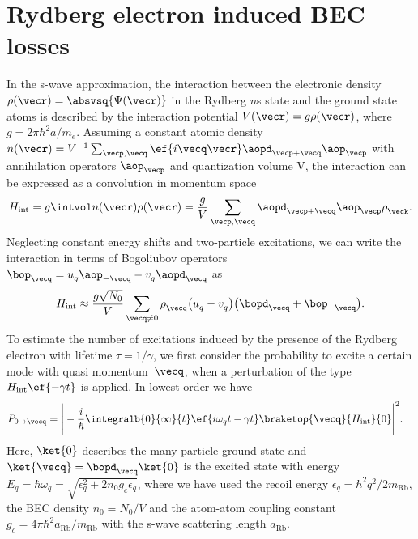 \chapter{Rydberg electron induced BEC losses}
\label{rydberg_losses}

\newcommand{\bogu}{\ensuremath{u^{\phantom\dagger}}\xspace}
\newcommand{\bogv}{\ensuremath{v^{\phantom\dagger}}\xspace}
\newcommand{\rhok}{\ensuremath{\rho^{\phantom\dagger}_{\veck}}\xspace}
\newcommand{\rhoq}{\ensuremath{\rho^{\phantom\dagger}_{\veck}}\xspace}
\newcommand{\rhoz}{\ensuremath{\rho^{\phantom\dagger}_{0}}\xspace}

In the s-wave approximation, the interaction between the electronic density $\rho(\vecr)=\absvsq{\Psi(\vecr)}$ in the Rydberg $n$s state and the ground state atoms is described by the interaction potential $V(\vecr)=g \rho(\vecr)$, where $g=2\pi \hbar^2 a/m_e$. Assuming a constant atomic density $n(\vecr)=V^{-1} \sum_{\vecp,\vecq} \ef{i\vecq\vecr}\aopd_{\vecp+\vecq} \aop_{\vecp}$ with annihilation operators $\aop_{\vecp}$ and quantization volume V, the interaction can be expressed as a convolution in momentum space
\begin{align}
H_\text{int} = g\intvol n(\vecr)\rho(\vecr) = \frac{g}{V} \sum_{\vecp,\vecq} \aopd_{\vecp+\vecq} \aop_{\vecp} \rhoq.
\end{align}
Neglecting constant energy shifts and two-particle excitations, we can write the interaction in terms of Bogoliubov operators $\bop_{\vecq}=\bogu_q \aop_{-\vecq} - \bogv_q \aopd_{\vecq}$ as
\begin{align}
H_\text{int}\approx\frac{g\sqrt{N_0}}{V} \sum_{\vecq\ne 0} \rho^{\phantom\dagger}_{\vecq} \big(\bogu_{q}-\bogv_{q}\big) \big(\bopd_{\vecq}+\bop_{-\vecq}\big).
\end{align}
To estimate the number of excitations induced by the presence of the Rydberg electron with lifetime $\tau=1/\gamma$, we first consider the probability to excite a certain mode with quasi momentum~$\vecq$, when a perturbation of the type $H_\text{int} \ef{-\gamma t}$ is applied. In lowest order we have
\begin{align}
P_{0\rightarrow\vecq}&=\Bigg|-\frac{i}{\hbar}\integralb{0}{\infty}{t}\ef{i\omega_{q}t-\gamma t}\braketop{\vecq}{H_\text{int}}{0}\Bigg|^2.
\end{align}
Here, $\ket{0}$ describes the many particle ground state and $\ket{\vecq}=\bopd_{\vecq}\ket{0}$ is the excited state with energy $E_{q}=\hbar\omega_{q}=\sqrt{\epsilon_{q}^2+2n_0g_c\epsilon_{q}}$, where we have used the recoil energy $\epsilon_{q}=\hbar^2 q^2/2m_\text{Rb}$, the BEC density $n_0=N_0/V$ and the atom-atom coupling constant $g_c=4\pi \hbar ^2a_{\text{Rb}}/m_{\text{Rb}}$ with the s-wave scattering length $a_{\text{Rb}}$. %
